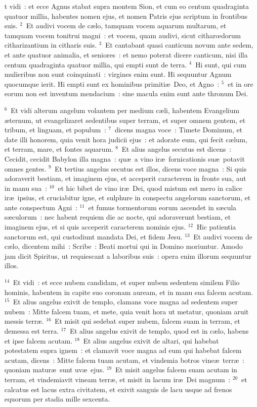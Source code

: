 \bchapter
{}t vidi~: et ecce Agnus stabat supra montem Sion, et cum eo centum quadraginta quatuor millia, habentes nomen ejus, et nomen Patris ejus scriptum in frontibus suis.
${}^{2}$~Et audivi vocem de c\ae lo, tamquam vocem aquarum multarum, et tamquam vocem tonitrui magni~: et vocem, quam audivi, sicut citharœdorum citharizantium in citharis suis.
${}^{3}$~Et cantabant quasi canticum novum ante sedem, et ante quatuor animalia, et seniores~: et nemo poterat dicere canticum, nisi illa centum quadraginta quatuor millia, qui empti sunt de terra.
${}^{4}$~Hi sunt, qui cum mulieribus non sunt coinquinati~: virgines enim sunt. Hi sequuntur Agnum quocumque ierit. Hi empti sunt ex hominibus primiti\ae\ Deo, et Agno~:
${}^{5}$~et in ore eorum non est inventum mendacium~: sine macula enim sunt ante thronum Dei.


${}^{6}$~Et vidi alterum angelum volantem per medium c\ae li, habentem Evangelium \ae ternum, ut evangelizaret sedentibus super terram, et super omnem gentem, et tribum, et linguam, et populum~:
${}^{7}$~dicens magna voce~: Timete Dominum, et date illi honorem, quia venit hora judicii ejus~: et adorate eum, qui fecit c\ae lum, et terram, mare, et fontes aquarum.
${}^{8}$~Et alius angelus secutus est dicens~: Cecidit, cecidit Babylon illa magna~: qu\ae\ a vino ir\ae\ fornicationis su\ae\ potavit omnes gentes.
${}^{9}$~Et tertius angelus secutus est illos, dicens voce magna~: Si quis adoraverit bestiam, et imaginem ejus, et acceperit caracterem in fronte sua, aut in manu sua~:
${}^{10}$~et hic bibet de vino ir\ae\ Dei, quod mistum est mero in calice ir\ae\ ipsius, et cruciabitur igne, et sulphure in conspectu angelorum sanctorum, et ante conspectum Agni~:
${}^{11}$~et fumus tormentorum eorum ascendet in s\ae cula s\ae culorum~: nec habent requiem die ac nocte, qui adoraverunt bestiam, et imaginem ejus, et si quis acceperit caracterem nominis ejus.
${}^{12}$~Hic patientia sanctorum est, qui custodiunt mandata Dei, et fidem Jesu.
${}^{13}$~Et audivi vocem de c\ae lo, dicentem mihi~: Scribe~: Beati mortui qui in Domino moriuntur. Amodo jam dicit Spiritus, ut requiescant a laboribus suis~: opera enim illorum sequuntur illos.


${}^{14}$~Et vidi~: et ecce nubem candidam, et super nubem sedentem similem Filio hominis, habentem in capite suo coronam auream, et in manu sua falcem acutam.
${}^{15}$~Et alius angelus exivit de templo, clamans voce magna ad sedentem super nubem~: Mitte falcem tuam, et mete, quia venit hora ut metatur, quoniam aruit messis terr\ae .
${}^{16}$~Et misit qui sedebat super nubem, falcem suam in terram, et demessa est terra.
${}^{17}$~Et alius angelus exivit de templo, quod est in c\ae lo, habens et ipse falcem acutam.
${}^{18}$~Et alius angelus exivit de altari, qui habebat potestatem supra ignem~: et clamavit voce magna ad eum qui habebat falcem acutam, dicens~: Mitte falcem tuam acutam, et vindemia botros vine\ae\ terr\ae~: quoniam matur\ae\ sunt uv\ae\ ejus.
${}^{19}$~Et misit angelus falcem suam acutam in terram, et vindemiavit vineam terr\ae , et misit in lacum ir\ae\ Dei magnum~:
${}^{20}$~et calcatus est lacus extra civitatem, et exivit sanguis de lacu usque ad frenos equorum per stadia mille sexcenta.

